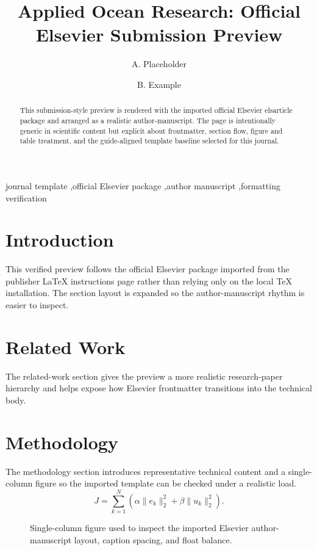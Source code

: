\documentclass[preprint,12pt]{elsarticle}
\begin{document}
\begin{frontmatter}
\title{Applied Ocean Research: Official Elsevier Submission Preview}
\author{A. Placeholder}
\author{B. Example}
\address{Department of Verified Templates, Placeholder Institute}
\begin{abstract}
This submission-style preview is rendered with the imported official Elsevier elsarticle package and arranged as a realistic author-manuscript. The page is intentionally generic in scientific content but explicit about frontmatter, section flow, figure and table treatment, and the guide-aligned template baseline selected for this journal.
\end{abstract}
\begin{keyword}
journal template \sep official Elsevier package \sep author manuscript \sep formatting verification
\end{keyword}
\end{frontmatter}
\section{Introduction}
This verified preview follows the official Elsevier package imported from the publisher LaTeX instructions page rather than relying only on the local TeX installation. The section layout is expanded so the author-manuscript rhythm is easier to inspect.
\section{Related Work}
The related-work section gives the preview a more realistic research-paper hierarchy and helps expose how Elsevier frontmatter transitions into the technical body.
\section{Methodology}
The methodology section introduces representative technical content and a single-column figure so the imported template can be checked under a realistic load.
\begin{equation}
J = \sum_{k=1}^{N} \left( \alpha \|e_k\|_2^2 + \beta \|u_k\|_2^2 \right).
\end{equation}
\begin{figure}[t]
\centering
{}
\caption{Single-column figure used to inspect the imported Elsevier author-manuscript layout, caption spacing, and float balance.}
\end{figure}
\end{document}

